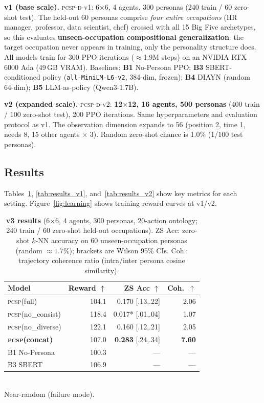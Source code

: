 \documentclass[conference]{IEEEtran}
\newcommand{\PCSP}{\textsc{pcsp}\xspace}
\newcommand{\PCSPD}{\textsc{pcsp-d}\xspace}
\begin{document}
\textbf{v1 (base scale).}
\PCSPD-v1: 6$\times$6, 4 agents, 300 personas (240 train / 60 zero-shot test).
The held-out 60 personas comprise \emph{four entire occupations} (HR manager,
professor, data scientist, chef) crossed with all 15 Big Five archetypes, so
this evaluates \textbf{unseen-occupation compositional generalization}: the
target occupation never appears in training, only the personality structure
does.
All models train for 300 PPO iterations ($\approx$1.9M steps) on an NVIDIA
RTX 6000 Ada (49\,GB VRAM).
Baselines: \textbf{B1} No-Persona PPO; \textbf{B3} SBERT-conditioned policy
(\texttt{all-MiniLM-L6-v2}, 384-dim, frozen); \textbf{B4} DIAYN (random 64-dim);
\textbf{B5} LLM-as-policy (Qwen3-1.7B).

\textbf{v2 (expanded scale).}
\PCSPD-v2: \textbf{12$\times$12, 16 agents, 500 personas} (400 train / 100
zero-shot test), 200 PPO iterations.
Same hyperparameters and evaluation protocol as v1.
The observation dimension expands to 56 (position 2, time 1, needs 8,
15 other agents $\times$ 3).
Random zero-shot chance is 1.0\% (1/100 test personas).

\subsection{Results}

Tables~\ref{tab:results_v3}, \ref{tab:results_v1}, and~\ref{tab:results_v2}
show key metrics for each setting. Figure~\ref{fig:learning} shows training
reward curves at v1/v2.

\begin{table}[t]
  \centering
  \small
  \caption{%
    \textbf{v3 results} (6$\times$6, 4 agents, 300 personas, 20-action
    ontology; 240 train / 60 zero-shot held-out occupations).
    ZS Acc: zero-shot $k$-NN accuracy on 60 unseen-occupation personas
    (random $\approx\!1.7\%$); brackets are Wilson 95\% CIs.
    Coh.: trajectory coherence ratio (intra/inter persona cosine similarity).}
  \label{tab:results_v3}
  \setlength{\tabcolsep}{3pt}
  \begin{tabular}{lrrr}
    \toprule
    Model & Reward $\uparrow$ & ZS Acc $\uparrow$ & Coh.\ $\uparrow$ \\
    \midrule
    \PCSP (full)                 & 104.1 & 0.170 \scriptsize{[.13,.22]}              & 2.06 \\
    \PCSP (no\_consist)          & 118.4 & 0.017* \scriptsize{[.01,.04]}             & 1.07 \\
    \PCSP (no\_diverse)          & 122.1 & 0.160 \scriptsize{[.12,.21]}              & 2.05 \\
    \textbf{\PCSP (concat)}      & 107.0 & \textbf{0.283} \scriptsize{[.24,.34]}     & \textbf{7.60} \\
    B1 No-Persona                & 100.3 & ---                                        & --- \\
    B3 SBERT                     & 106.9 & ---                                        & --- \\
    \bottomrule
  \end{tabular}\\[2pt]
  {\footnotesize * Near-random (failure mode).}
\end{table}
\end{document}
